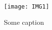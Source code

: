 \documentclass{article}
\begin{document}
\lipsum[1-2]
\begin{figure}
  \hrulefill\par
  \lipsum[3-4]
  \texttt{[image: IMG1]}
  \caption{Some caption}\label{fig:label1}
  \hrulefill
\end{figure}
\end{document}
